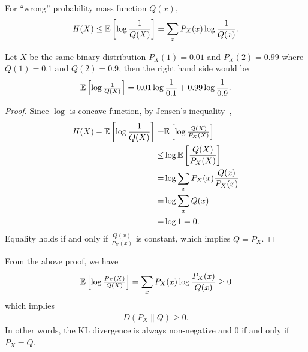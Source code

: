 \documentclass{article}
\begin{document}
\begin{theorem}
For ``wrong'' probability mass function $Q(x)$,
\begin{align}
    H(X) \leq \Expec{\log \frac{1}{Q(X)}} = \sum_{x} P_X(x) \log \frac{1}{Q(x)}.
\end{align}
\end{theorem}
\begin{example}
    Let $X$ be the same binary distribution $P_X(1) = 0.01$ and $P_X(2) = 0.99$ where $Q(1) = 0.1$ and $Q(2) = 0.9$, then the right hand side would be
    \begin{align}
        \Expec{\log \frac{1}{Q(X)}} = 0.01 \log \frac{1}{0.1} + 0.99 \log\frac{1}{0.9}.
    \end{align}
\end{example}
\begin{proof}
    Since $\log$ is concave function, by Jensen's inequality~\cite{jensen1906fonctions},
    \begin{align}
        H(X) - \Expec{\log \frac{1}{Q(X)}} =& \Expec{\log \frac{Q(X)}{P_X(X)}}\\
        \leq& \log \Expec{\frac{Q(X)}{P_X(X)}}\\
        =& \log \sum_x P_X(x)\frac{Q(x)}{P_X(x)}\\
        =& \log \sum_x Q(x)\\
        =& \log 1 =0.
    \end{align}
    Equality holds if and only if $\frac{Q(x)}{P_X(x)}$ is constant, which implies $Q = P_X$.
\end{proof}

\begin{remark}
    From the above proof, we have
    \begin{align}
        \Expec{\log \frac{P_X(X)}{Q(X)}} = \sum_{x} P_X(x) \log\frac{P_X(x)}{Q(x)}\geq 0
    \end{align}
    which implies
    \begin{align}
        D(P_X\|Q) \geq 0.
    \end{align}
    In other words, the KL divergence is always non-negative and 0 if and only if $P_X=Q$.
\end{remark}
\end{document}
